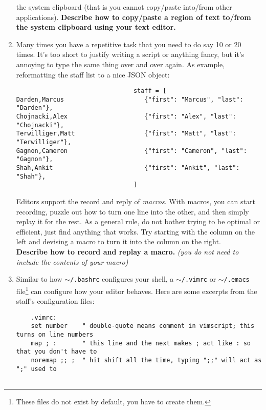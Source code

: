 \documentclass{article}
\begin{document}
\begin{enumerate}
    the system clipboard (that is you cannot copy/paste into/from other
    applications).
    \textbf{Describe how to copy/paste a region of text to/from the system
    clipboard using your text editor.}
    \vspace{6em}
  \item Many times you have a repetitive task that you need to do say 10 or 20
    times. It's too short to justify writing a script or anything fancy, but
    it's annoying to type the same thing over and over again. As example,
    reformatting the staff list to a nice JSON object:
    \begin{verbatim}                                staff = [
Darden,Marcus                      {"first": "Marcus", "last": "Darden"},
Chojnacki,Alex                     {"first": "Alex", "last": "Chojnacki"},
Terwilliger,Matt                   {"first": "Matt", "last": "Terwilliger"},
Gagnon,Cameron                     {"first": "Cameron", "last": "Gagnon"},
Shah,Ankit                         {"first": "Ankit", "last": "Shah"},
                                ]\end{verbatim}
    Editors support the record and reply of \emph{macros}. With macros, you
    can start recording, puzzle out how to turn one line into the other, and
    then simply replay it for the rest. As a general rule, do not bother
    trying to be optimal or efficient, just find anything that works.
    Try starting with the column on the left and devising a macro to turn it
    into the column on the right.\\
    \textbf{Describe how to record and replay a macro.}
    \emph{\small (you do not need to include the contents of your macro)}
    \vspace{6em}

\newpage
  \item Similar to how \texttt{$\sim$/.bashrc} configures your shell, a
    \texttt{$\sim$/.vimrc} or \texttt{$\sim$/.emacs} file\footnote{
      These files do not exist by default, you have to create them.
    } can configure how your editor behaves. Here are some excerpts from the
    staff's configuration files:
    \begin{lstlisting}
    .vimrc:
    set number    " double-quote means comment in vimscript; this turns on line numbers
    map ; :       " this line and the next makes ; act like : so that you don't have to
    noremap ;; ;  " hit shift all the time, typing ";;" will act as ";" used to


\end{lstlisting}
\end{enumerate}
\end{document}

